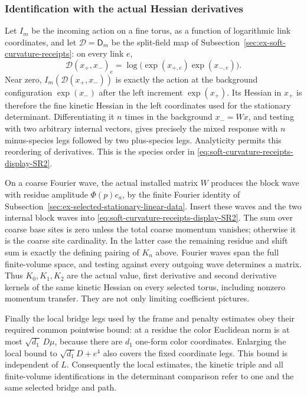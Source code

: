 \subsubsection{Identification with the actual Hessian derivatives}
Let $I_m$ be the incoming action on a fine torus, as a function of
logarithmic link coordinates, and let $\mathcal D=\mathsf D_m$ be the
split-field map of Subsection~\ref{sec:ex-soft-curvature-receipts}: on
every link $e$,
\[
 \mathcal D(x_+,x_-)_e
       =\log\bigl(\exp(x_{+,e})\exp(x_{-,e})\bigr).
\]
Near zero,
$I_m(\mathcal D(x_+,x_-))$ is exactly the action at the background
configuration $\exp(x_-)$ after the left increment $\exp(x_+)$. Its Hessian in $x_+$ is therefore
the fine kinetic Hessian in the left coordinates used for the
stationary determinant. Differentiating it $n$ times in the
background $x_-=Wx$, and testing with two arbitrary internal
vectors, gives precisely the mixed response with $n$ minus-species
legs followed by two plus-species legs. Analyticity permits this
reordering of derivatives. This is the species order in \eqref{eq:soft-curvature-receipts-display-SR2}.

On a coarse Fourier wave, the actual installed matrix $W$ produces
the block wave with residue amplitude $\Phi(p)e_a$, by the
finite Fourier identity of
Subsection~\ref{sec:ex-selected-stationary-linear-data}. Insert these
waves and the two internal block waves into \eqref{eq:soft-curvature-receipts-display-SR2}. The sum over
coarse base sites is zero unless the total coarse momentum vanishes;
otherwise it is the coarse site cardinality. In the latter case
the remaining residue and shift sum is exactly the defining
pairing of $K_n$ above. Fourier waves span the full finite-volume
space, and testing against every outgoing wave determines a matrix.
Thus $K_0,K_1,K_2$ are the actual value, first derivative and
second derivative kernels of the same kinetic Hessian on every
selected torus, including nonzero momentum transfer. They are
not only limiting coefficient pictures.

Finally the local bridge legs used by the frame and penalty estimates
obey their required common pointwise bound: at a residue the color
Euclidean norm is at most $\sqrt{d_1}\,D\mu$, because there are
$d_1$ one-form color coordinates. Enlarging the local bound to
$\sqrt{d_1}D+e^4$ also covers the fixed coordinate legs. This bound
is independent of $L$. Consequently the local estimates, the kinetic
triple and all finite-volume identifications in the determinant
comparison refer to one and the same selected bridge and path.

